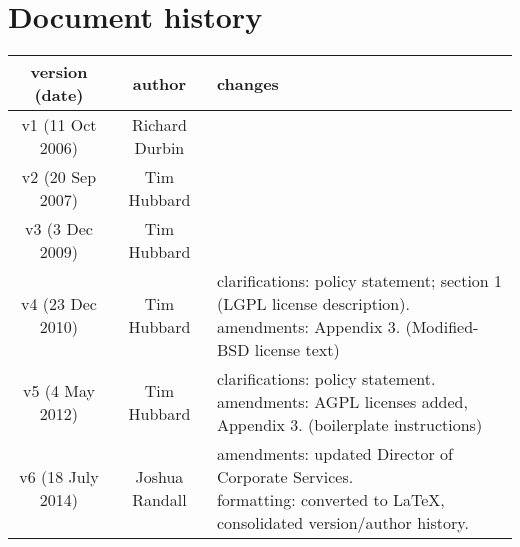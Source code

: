 \documentclass[10pt,a4paper]{article}
\begin{document}
\section*{Document history}

\begin{tabular}{|c|c|p{6cm}|}
\hline
\textbf{version (date)}	& \textbf{author}	& \textbf{changes} \\
\hline
v1 (11 Oct 2006)		& Richard Durbin	& \parbox{6cm}{
} \\
\hline
v2 (20 Sep 2007)		& Tim Hubbard		& \parbox{6cm}{
} \\
\hline
v3 (3 Dec 2009)		& Tim Hubbard		& \parbox{6cm}{
} \\
\hline
v4 (23 Dec 2010) 		& Tim Hubbard		& \parbox{6cm}{
clarifications: policy statement; section 1 (LGPL license description). \\
amendments: Appendix 3. (Modified-BSD license text) \\
} \\
\hline
v5 (4 May 2012)		& Tim Hubbard		& \parbox{6cm}{
clarifications: policy statement. \\
amendments: AGPL licenses added, Appendix 3. (boilerplate instructions) \\
} \\
\hline
v6 (18 July 2014)		& Joshua Randall	& \parbox{6cm}{
amendments: updated Director of Corporate Services. \\
formatting: converted to LaTeX, consolidated version/author history. \\
} \\
\hline
\end{tabular}
\end{document}
